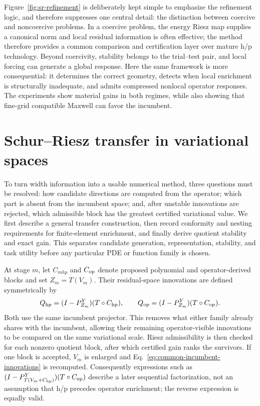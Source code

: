 \documentclass[11pt]{article}
\numberwithin{algorithm}{section}
\theoremstyle{definition}\newtheorem{definition}[theorem]{Definition}
\theoremstyle{remark}\newtheorem{remark}[theorem]{Remark}
\begin{document}
Figure~\ref{fig:sr-refinement} is deliberately kept simple to emphasize the
refinement logic, and therefore suppresses one central detail: the distinction
between coercive and noncoercive problems. In a coercive problem, the energy Riesz map supplies a
canonical norm and local residual information is often effective; the method
therefore provides a common comparison and certification layer over mature
h/p technology. Beyond coercivity, stability belongs to the trial--test pair,
and local forcing can generate a global response. Here the same framework is
more consequential: it determines the correct geometry, detects when local
enrichment is structurally inadequate, and admits compressed nonlocal
operator responses.  The experiments show material gains in both regimes,
while also showing that fine-grid compatible Maxwell can favor the incumbent.

\section{Schur--Riesz transfer in variational spaces}
To turn width information into a usable numerical method, three questions must
be resolved: how candidate directions are computed from the operator; which
part is absent from the incumbent space; and, after unstable innovations are
rejected, which admissible block has the greatest certified variational value.
We first describe a
general transfer construction, then record conformity and nesting requirements
for finite-element enrichment, and finally derive quotient stability and exact
gain.  This separates candidate generation, representation, stability, and
task utility before any particular PDE or function family is chosen.

At stage $m$, let $C_{
m hp}$ and $C_{\rm op}$ denote proposed polynomial and
operator-derived blocks and set $Z_m=T(V_m)$.  Their residual-space innovations
are defined symmetrically by
\begin{equation}
 Q_{\rm hp}=(I-P_{Z_m}^Y)(T\circ C_{\rm hp}),\qquad
 Q_{\rm op}=(I-P_{Z_m}^Y)(T\circ C_{\rm op}).
 \label{eq:common-incumbent-innovations}
\end{equation}
Both use the same incumbent projector.  This removes what either family
already shares with the incumbent, allowing their remaining operator-visible
innovations to be compared on the same variational scale.  Riesz admissibility
is then checked for each nonzero quotient block, after which certified gain
ranks the survivors.
If one block is accepted, $V_m$ is enlarged and Eq.~\eqref{eq:common-incumbent-innovations}
is recomputed.  Consequently expressions such as
$(I-P_{T(V_m+C_{\rm hp})}^Y)(T\circ C_{\rm op})$ describe a later sequential
factorization, not an assumption that h/p precedes operator enrichment; the
reverse expression is equally valid.
\end{document}
